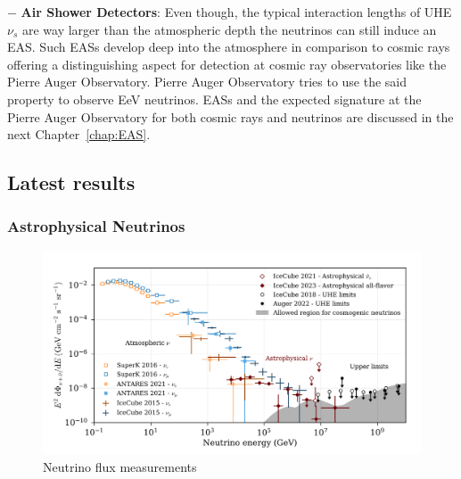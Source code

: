 \begin{description}
  \item $-$ \textbf{Air Shower Detectors}: Even though, the typical interaction lengths of UHE$\nu_s$ are way larger than the atmospheric depth the neutrinos can still induce an EAS. Such EASs develop deep into the atmosphere in comparison to cosmic rays offering a distinguishing aspect for detection at cosmic ray observatories like the Pierre Auger Observatory. Pierre Auger Observatory tries to use the said property to observe EeV neutrinos. EASs and the expected signature at the Pierre Auger Observatory for both cosmic rays and neutrinos are discussed in the next Chapter~\ref{chap:EAS}.   

  \end{description}

\subsection{Latest results}
  \label{subsec:Nuresults}
  
\subsubsection*{Astrophysical Neutrinos}

\begin{figure}[t!]
  \centering
  \includegraphics[width=14.5cm]{thesis_figures/CRnNu/Nu_flux_measurement.png}
  \caption{Neutrino flux measurements~\cite{ParticleDataGroup:2024cfk}}
  \label{fig:Nu_flux_measurement}
\end{figure}

